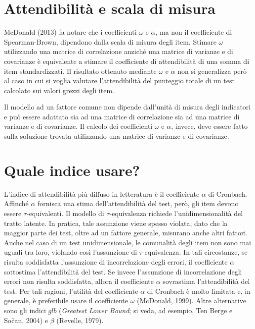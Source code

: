 \documentclass[
  11pt,
]{krantz}
\theoremstyle{definition}
\theoremstyle{definition}
\theoremstyle{definition}
\theoremstyle{definition}
\theoremstyle{remark}
\begin{document}
\hypertarget{attendibilituxe0-e-scala-di-misura}{%
\section{Attendibilità e scala di misura}\label{attendibilituxe0-e-scala-di-misura}}

McDonald (2013) fa notare che i coefficienti \(\omega\) e \(\alpha\), ma non il coefficiente di Spearman-Brown, dipendono dalla scala di misura degli item. Stimare \(\omega\) utilizzando una matrice di correlazione anziché una matrice di varianze e di covarianze è equivalente a stimare il coefficiente di attendibilità di una somma di item standardizzati. Il risultato ottenuto mediante \(\omega\) e \(\alpha\) non si generalizza però al caso in cui si voglia valutare l'attendibilità del punteggio totale di un test calcolato sui valori grezzi degli item.

Il modello ad un fattore comune non dipende dall'unità di misura degli indicatori e può essere adattato sia ad una matrice di correlazione sia ad una matrice di varianze e di covarianze. Il calcolo dei coefficienti \(\omega\) e \(\alpha\), invece, deve essere fatto sulla soluzione trovata utilizzando una matrice di varianze e di covarianze.

\hypertarget{quale-indice-usare}{%
\section{Quale indice usare?}\label{quale-indice-usare}}

L'indice di attendibilità più diffuso in letteratura è il coefficiente \(\alpha\) di Cronbach. Affinché \(\alpha\) fornisca una stima dell'attendibilità del test, però, gli item devono essere \(\tau\)-equivalenti. Il modello di \(\tau\)-equivalenza richiede l'unidimensionalità del tratto latente. In pratica, tale assunzione viene spesso violata, dato che la maggior parte dei test, oltre ad un fattore generale, misurano anche altri fattori. Anche nel caso di un test unidimensionale, le comunalità degli item non sono mai uguali tra loro, violando così l'assunzione di \(\tau\)-equivalenza. In tali circostanze, se risulta soddisfatta l'assunzione di incorrelazione degli errori, il coefficiente \(\alpha\) sottostima l'attendibilità del test. Se invece l'assunzione di incorrelazione degli errori non risulta soddisfatta, allora il coefficiente \(\alpha\) sovrastima l'attendibilità del test. Per tali ragioni, l'utilità del coefficiente \(\alpha\) di Cronbach è molto limitata e, in generale, è preferibile usare il coefficiente \(\omega\) (McDonald, 1999). Altre alternative sono gli indici \(glb\) (\emph{Greatest Lower Bound}; si veda, ad esempio, Ten Berge e Sočan, 2004) e \(\beta\) (Revelle, 1979).
\end{document}

